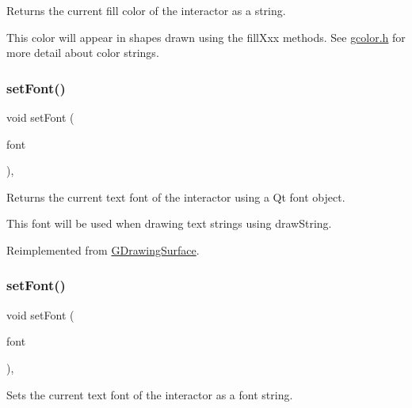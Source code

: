 Returns the current fill color of the interactor as a string. 

This color will appear in shapes drawn using the fill\+Xxx methods. See \mbox{\hyperlink{gcolor_8h_source}{gcolor.\+h}} for more detail about color strings. \mbox{\label{classGCanvas_ad1d75b3840a41ba7d1e8a921696dc684}} 
\subsubsection{\texorpdfstring{set\+Font()}{setFont()}\hspace{0.1cm}{\footnotesize\ttfamily [1/2]}}
{\footnotesize\ttfamily void set\+Font (\begin{DoxyParamCaption}\item[{const Q\+Font \&}]{font }\end{DoxyParamCaption})\hspace{0.3cm}{\ttfamily [override]}, {\ttfamily [virtual]}}



Returns the current text font of the interactor using a Qt font object. 

This font will be used when drawing text strings using draw\+String. 

Reimplemented from \mbox{\hyperlink{classGDrawingSurface}{G\+Drawing\+Surface}}.

\mbox{\label{classGCanvas_a51367c9fd2709973b1f7238734f93891}} 
\subsubsection{\texorpdfstring{set\+Font()}{setFont()}\hspace{0.1cm}{\footnotesize\ttfamily [2/2]}}
{\footnotesize\ttfamily void set\+Font (\begin{DoxyParamCaption}\item[{const std\+::string \&}]{font }\end{DoxyParamCaption})\hspace{0.3cm}{\ttfamily [override]}, {\ttfamily [virtual]}}



Sets the current text font of the interactor as a font string. 

